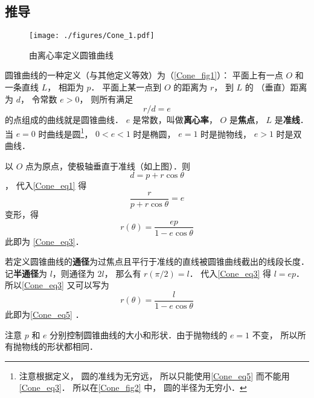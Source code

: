 \subsection{推导}

\begin{figure}[ht]
\centering
\texttt{[image: ./figures/Cone\_1.pdf]}
\caption{由离心率定义圆锥曲线}\label{Cone_fig1}
\end{figure}

圆锥曲线的一种定义（与其他定义等效）为（\autoref{Cone_fig1}）：
平面上有一点 $O$ 和一条直线 $L$， 相距为 $p$． 
平面上某一点到 $O$ 的距离为 $r$， 到 $L$ 的
（垂直）距离为 $d$， 令常数 $e > 0$， 则所有满足
\begin{equation}\label{Cone_eq1}
r/d = e
\end{equation}
的点组成的曲线就是圆锥曲线． $e$ 是常数，叫做\textbf{离心率}， $O$ 是\textbf{焦点}， $L$ 是\textbf{准线}． 当 $e = 0$ 时曲线是圆\footnote{注意根据定义， 圆的准线为无穷远， 所以只能使用\autoref{Cone_eq5} 而不能用\autoref{Cone_eq3}． 所以在\autoref{Cone_fig2} 中， 圆的半径为无穷小．}， $0 < e < 1$ 时是椭圆， $e = 1$ 时是抛物线， $e > 1$ 时是双曲线．

以 $O$ 点为原点，使极轴垂直于准线（如上图）．则 $$d = p + r \cos \theta $$， 代入\autoref{Cone_eq1} 得
\begin{equation}\label{Cone_eq2}
\frac{r}{p + r \cos \theta } = e
\end{equation}
变形，得
\begin{equation}
r(\theta) = \frac{ep}{1 - e\cos \theta }
\end{equation}
此即为 \autoref{Cone_eq3}．

若定义圆锥曲线的\textbf{通径}为过焦点且平行于准线的直线被圆锥曲线截出的线段长度． 记\textbf{半通径}为 $l$，则通径为 $2l$， 那么有 $r(\pi /2) = l$． 代入\autoref{Cone_eq3} 得 $l = ep$． 所以\autoref{Cone_eq3} 又可以写为
\begin{equation}\label{Cone_eq4}
r(\theta)  = \frac{l}{1 - e\cos \theta }
\end{equation}
此即为\autoref{Cone_eq5} ．

注意 $p$ 和 $e$ 分别控制圆锥曲线的大小和形状．由于抛物线的 $e = 1$ 不变， 所以所有抛物线的形状都相同．
